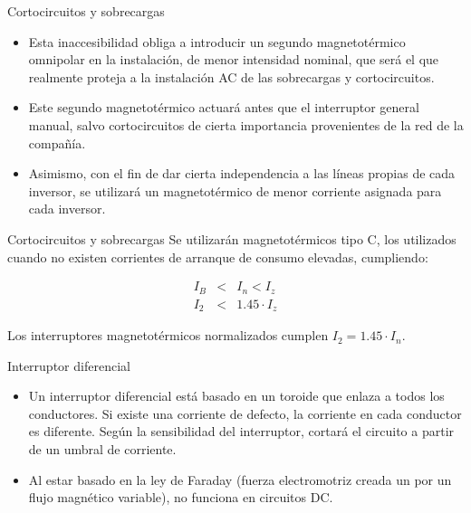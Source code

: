 \documentclass[xcolor={usenames,svgnames,dvipsnames}]{beamer}
\begin{document}
\begin{frame}[label=sec-5-2-2]{Cortocircuitos y sobrecargas}
\begin{itemize}
\item Esta inaccesibilidad obliga a introducir un \alert{segundo magnetotérmico
omnipolar} en la instalación, de menor intensidad nominal, que será
el que realmente proteja a la instalación AC de las sobrecargas y
cortocircuitos.

\item Este segundo magnetotérmico actuará antes que el interruptor general
manual, salvo cortocircuitos de cierta importancia provenientes de la
red de la compañía.

\item Asimismo, con el fin de dar cierta independencia a las líneas propias
de cada inversor, se utilizará un magnetotérmico de menor corriente
asignada para cada inversor.
\end{itemize}
\end{frame}

\begin{frame}[label=sec-5-2-3]{Cortocircuitos y sobrecargas}
Se utilizarán \alert{magnetotérmicos tipo C}, los utilizados cuando no existen
corrientes de arranque de consumo elevadas, cumpliendo:

$$\begin{aligned}
I_{B} & < & I_{n}<I_{z}\\
I_{2} & < & 1.45\cdot I_{z}\end{aligned}$$

Los interruptores magnetotérmicos normalizados cumplen
$I_{2}=1.45\cdot I_{n}$.
\end{frame}

\begin{frame}[label=sec-5-2-4]{Interruptor diferencial}
\begin{itemize}
\item Un interruptor diferencial está basado en un toroide que enlaza a
todos los conductores. Si existe una corriente de defecto, la
corriente en cada conductor es diferente. Según la sensibilidad del
interruptor, cortará el circuito a partir de un umbral de corriente.

\item Al estar basado en la ley de Faraday (fuerza electromotriz creada un
por un flujo magnético variable), \alert{no funciona en circuitos DC}.
\end{itemize}
\end{frame}
\end{document}
